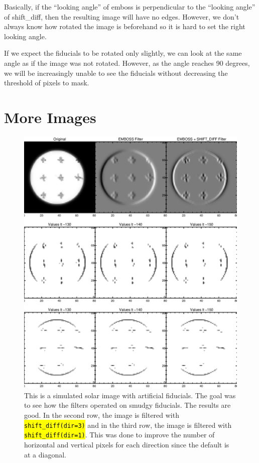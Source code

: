 \documentclass[10pt]{article}
\begin{document}
    Basically, if the ``looking angle'' of emboss is perpendicular to the ``looking angle'' of shift\_diff, then the resulting image will have no edges. However, we don't always know how rotated the image is beforehand so it is hard to set the right looking angle. 


    If we expect the fiducials to be rotated only slightly, we can look at the same angle as if the image was not rotated. However, as the angle reaches 90 degrees, we will be increasingly unable to see the fiducials without decreasing the threshold of pixels to mask.

\newpage 

\section{More Images}    

\begin{figure}[!ht]
    \centering
    \includegraphics[width=.9\textwidth]{plots_tables_images/fidcomp.eps}    
    \caption{This is a simulated solar image with artificial fiducials. The goal was to see how the filters operated on smudgy fiducials. The results are good. In the second row, the image is filtered with \hl{\texttt{shift\_diff(dir=3)}} and in the third row, the image is filtered with \hl{\texttt{shift\_diff(dir=1)}}. This was done to improve the number of horizontal and vertical pixels for each direction since the default is at a diagonal.}
\end{figure}
\end{document}
